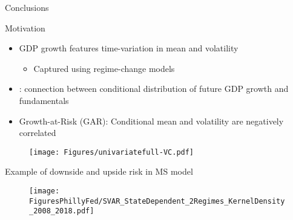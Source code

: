 \documentclass[xcolor=dvipsnames, xcolor=table, 10pt]{beamer}
\newcommand{\rr}[1]{{\color{darkred}#1}}
\begin{document}

\begin{frame}{Conclusions}
\end{frame}





\begin{frame}

\end{frame}

\begin{frame}{Motivation}
\vspace*{0.12in}
 \begin{itemize}
     \item GDP growth features time-variation in mean and volatility
 \medskip
     \begin{itemize}
         \item Captured using regime-change models
     \end{itemize}
    \bigskip
     \item \cite{ABG19}: connection between conditional distribution of future GDP growth and fundamentals
     \bigskip
     \item \rr{Growth-at-Risk (GAR)}: Conditional mean and volatility are negatively correlated
\end{itemize}

\begin{figure}
     \texttt{[image: Figures/univariatefull-VC.pdf]}
\end{figure}
\end{frame}


\begin{frame}{Example of downside and upside risk in MS model}

\begin{figure}
    \texttt{[image: FiguresPhillyFed/SVAR\_StateDependent\_2Regimes\_KernelDensity\_2008\_2018.pdf]}
\end{figure}

\end{frame}
\end{document}
